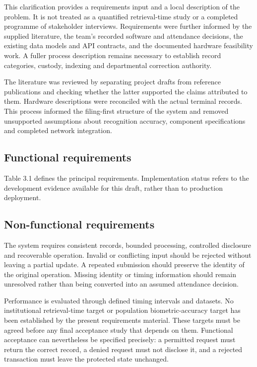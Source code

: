 This clarification provides a requirements input and a local description of the problem. It is not treated as a quantified retrieval-time study or a completed programme of stakeholder interviews. Requirements were further informed by the supplied literature, the team's recorded software and attendance decisions, the existing data models and API contracts, and the documented hardware feasibility work. A fuller process description remains necessary to establish record categories, custody, indexing and departmental correction authority.

The literature was reviewed by separating project drafts from reference publications and checking whether the latter supported the claims attributed to them. Hardware descriptions were reconciled with the actual terminal records. This process informed the filing-first structure of the system and removed unsupported assumptions about recognition accuracy, component specifications and completed network integration.

\subsection{Functional requirements}\label{sec:3-2-2}

Table 3.1 defines the principal requirements. Implementation status refers to the development evidence available for this draft, rather than to production deployment.




\subsection{Non-functional requirements}\label{sec:3-2-3}

The system requires consistent records, bounded processing, controlled disclosure and recoverable operation. Invalid or conflicting input should be rejected without leaving a partial update. A repeated submission should preserve the identity of the original operation. Missing identity or timing information should remain unresolved rather than being converted into an assumed attendance decision.

Performance is evaluated through defined timing intervals and datasets. No institutional retrieval-time target or population biometric-accuracy target has been established by the present requirements material. These targets must be agreed before any final acceptance study that depends on them. Functional acceptance can nevertheless be specified precisely: a permitted request must return the correct record, a denied request must not disclose it, and a rejected transaction must leave the protected state unchanged.


